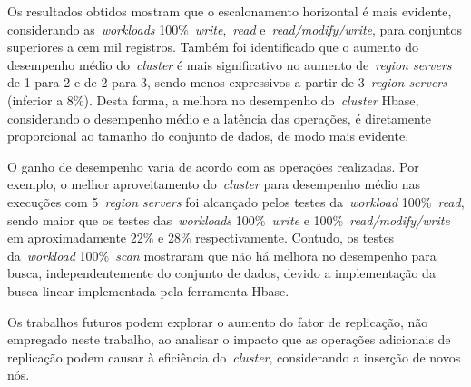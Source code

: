 \documentclass[12pt]{article}
\begin{document}
Os resultados obtidos mostram que o escalonamento horizontal é mais evidente, considerando as~\emph{workloads} 100\%~\emph{write},~\emph{read} e~\emph{read/modify/write}, para conjuntos superiores a cem mil registros. Também foi identificado que o aumento do desempenho médio do~\emph{cluster} é mais significativo no aumento de~\emph{region servers} de 1 para 2 e de 2 para 3, sendo menos expressivos a partir de 3~\emph{region servers} (inferior a 8\%). Desta forma, a melhora no desempenho do~\emph{cluster} Hbase, considerando o desempenho médio e a latência das operações, é diretamente proporcional ao tamanho do conjunto de dados, de modo mais evidente.

O ganho de desempenho varia de acordo com as operações realizadas. Por exemplo, o melhor aproveitamento do~\emph{cluster} para desempenho médio nas execuções com 5~\emph{region servers} foi alcançado pelos testes da~\emph{workload} 100\%~\emph{read}, sendo maior que os testes das~\emph{workloads} 100\%~\emph{write} e 100\%~\emph{read/modify/write} em aproximadamente 22\% e 28\% respectivamente. 
Contudo, os testes da~\emph{workload} 100\%~\emph{scan} mostraram que não há melhora no desempenho para busca, independentemente do conjunto de dados, devido a implementação da busca linear implementada pela ferramenta Hbase.

Os trabalhos futuros podem explorar o aumento do fator de replicação, não empregado neste trabalho, ao analisar o impacto que as operações adicionais de replicação podem causar à eficiência do~\emph{cluster}, considerando a inserção de novos nós.



\end{document}
